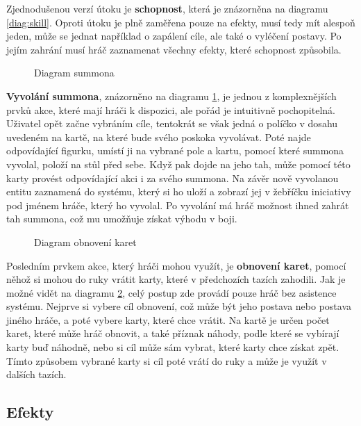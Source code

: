 Zjednodušenou verzí útoku je \textbf{schopnost}, která je znázorněna na diagramu \ref{diag:skill}. Oproti útoku je plně zaměřena pouze na efekty, musí tedy mít alespoň jeden, může se jednat například o zapálení cíle, ale také o vyléčení postavy. Po jejím zahrání musí hráč zaznamenat všechny efekty, které schopnost způsobila.

\begin{figure}[h]
    \centering
    \caption{Diagram summona}
    \label{diag:summon}
\end{figure}

\textbf{Vyvolání summona}, znázorněno na diagramu \ref{diag:summon}, je jednou z komplexnějších prvků akce, které mají hráči k dispozici, ale pořád je intuitivně pochopitelná. Uživatel opět začne vybráním cíle, tentokrát se však jedná o políčko v dosahu uvedeném na kartě, na které bude svého poskoka vyvolávat. Poté najde odpovídající figurku, umístí ji na vybrané pole a kartu, pomocí které summona vyvolal, položí na stůl před sebe. Když pak dojde na jeho tah, může pomocí této karty provést odpovídající akci i za svého summona. Na závěr nově vyvolanou entitu zaznamená do systému, který si ho uloží a zobrazí jej v žebříčku iniciativy pod jménem hráče, který ho vyvolal. Po vyvolání má hráč možnost ihned zahrát tah summona, což mu umožňuje získat výhodu v boji.

\begin{figure}[h]
    \centering
    \caption{Diagram obnovení karet}
    \label{diag:restore_cards}
\end{figure}

Posledním prvkem akce, který hráči mohou využít, je \textbf{obnovení karet}, pomocí něhož si mohou do ruky vrátit karty, které v předchozích tazích zahodili. Jak je možné vidět na diagramu \ref{diag:restore_cards}, celý postup zde provádí pouze hráč bez asistence systému. Nejprve si vybere cíl obnovení, což může být jeho postava nebo postava jiného hráče, a poté vybere karty, které chce vrátit. Na kartě je určen počet karet, které může hráč obnovit, a také příznak náhody, podle které se vybírají karty buď náhodně, nebo si cíl může sám vybrat, které karty chce získat zpět. Tímto způsobem vybrané karty si cíl poté vrátí do ruky a může je využít v dalších tazích.



\subsection{Efekty}
\label{subsec:design_effects}

